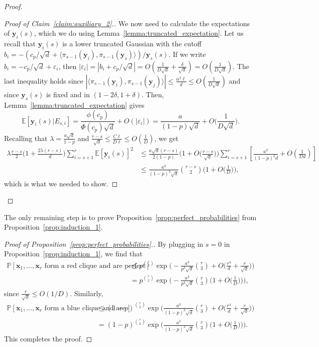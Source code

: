 \documentclass[11pt]{amsart}
\theoremstyle{definition}
\def\eps{\varepsilon}
\def\bE{\mathbb{E}}
\def\Pb{\mathbb{P}}
\def\bx{\boldsymbol{x}}
\def\by{\boldsymbol{y}}
\begin{document}
\begin{proof}
\begin{proof}[Proof of Claim~\ref{claim:auxiliary_2}.]
We now need to calculate the expectations of $\by_i(s)$, which we do using Lemma~\ref{lemma:truncated_expectation}. Let us recall that $\by_i(s)$ is a lower truncated Gaussian with the cutoff $b_i=-(c_p/\sqrt{d}+\langle \pi_{s-1}(\by_i), \pi_{s-1}(\by_s)\rangle)/\by_s(s)$. If we write $b_i=-c_p/\sqrt{d}+\eps_i$, then $|\eps_i|=|b_i+c_p/\sqrt{d}|=O(\frac{1}{D\sqrt{d}}+\frac{\delta}{\sqrt{d}})=O(\frac{1}{D\sqrt{d}})$. The last inequality holds since $|\langle \pi_{s-1}(\by_i), \pi_{s-1}(\by_j)\rangle|\leq \frac{\alpha^2\ell}{d}\leq O(\frac{1}{D\sqrt{d}})$ and since $\by_s(s)$ is fixed and in $(1-2\delta, 1+\delta)$. Then, Lemma~\ref{lemma:truncated_expectation} gives
{\smaller[0.3]
\[\bE[\by_i(s)|E_{s, i}]=\frac{\phi(c_p)}{\Phi(c_p)\sqrt{d}}\!+\!O(|\eps_i|)=\frac{a}{(1\!-\!p)\sqrt{d}}\!+\!O\Big(\frac{1}{D\sqrt{d}}\Big).\]
}
Recalling that $\lambda=\frac{a\sqrt{d}}{1-p}$ and $\frac{r-s}{\sqrt{d}}\leq \frac{C\ell}{D\ell}\leq O(\frac{1}{D})$, we get
{\smaller[0.3]
\begin{align*}
\lambda \frac{r\!-\!s}{2} \Big(1\!+\!\frac{2\lambda (r\!-\!s)}{d}\Big)\sum_{i=s+1}^r \bE[\by_i(s)]^2&\leq \frac{a\sqrt{d}(r\!-\!s)}{2(1\!-\!p)}\Big(1\!+\!O\Big(\frac{r\!-\!s}{\sqrt{d}}\Big)\Big)\sum_{i=s+1}^r \left[\frac{a^2}{(1\!-\!p)^2d}\!+\!O\left(\frac{1}{Dd}\right)\right]\\
&\leq \frac{a^3}{(1\!-\!p)^3\sqrt{d}}\binom{r\!-\!s}{2}\Big(1\!+\!O\big(\frac{1}{D}\big)\Big),
\end{align*}
}
which is what we needed to show.
\end{proof}
\end{proof}

The only remaining step is to prove Proposition~\ref{prop:perfect_probabilities} from Proposition~\ref{prop:induction_1}.

\begin{proof}[Proof of Proposition~\ref{prop:perfect_probabilities}.]
By plugging in $s=0$ in Proposition~\ref{prop:induction_1}, we find that
{\smaller[0.3]
\begin{align*}
    \Pb[\bx_1, \dots, \bx_r \text{ form a red clique and are perfect}]&\leq p^{\binom{r}{2}}\exp\bigg(\!-\!\frac{a^3}{p^3\sqrt{d}}\binom{r}{3}\!+\!O\Big(\frac{r^4}{d}\!+\!\frac{r}{\sqrt{d}}\Big)\bigg)\\
    &=p^{\binom{r}{2}}\exp\bigg(\!-\!\frac{a^3}{p^3\sqrt{d}}\binom{r}{3}\Big(1\!+\!O\Big(\frac{1}{D}\Big)\Big)\bigg),
\end{align*}
}
since $\frac{r}{\sqrt{d}}\leq O(1/D)$. Similarly,
{\smaller[0.3]
\begin{align*}
    \Pb[\bx_1, \dots, \bx_r \text{ form a blue clique and are perfect}]&\leq (1\!-\!p)^{\binom{r}{2}}\exp\bigg(\frac{a^3}{(1\!-\!p)^3\sqrt{d}}\binom{r}{3}\!+\!O\Big(\frac{r^4}{d}\!+\!\frac{r}{\sqrt{d}}\Big)\bigg)\\
    &=(1\!-\!p)^{\binom{r}{2}}\exp\bigg(\frac{a^3}{(1\!-\!p)^3\sqrt{d}}\binom{r}{3}\Big(1\!+\!O\Big(\frac{1}{D}\Big)\Big)\bigg).
\end{align*}
}
This completes the proof.
\end{proof}
\end{document}
